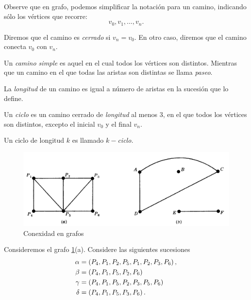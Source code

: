 	\begin{rem}
		Observe que en grafo, podemos simplificar la notación para un camino, indicando sólo los v\'ertices que recorre:
		$$v_{0}, v_{1},..., v_{n}.$$ 
	\end{rem}



	Diremos que el camino es \emph{cerrado} si $v_{n}=v_{0}.$ En otro caso, diremos que el camino conecta $v_{0}$ con $v_{n}.$
	 
	
	Un \emph{camino simple} es aquel en el cual todos los v\'ertices son distintos. Mientras que un camino en el que todas las aristas son distintas se llama \emph{paseo}.
	



	La \emph{longitud} de un camino es igual a número de aristas en la sucesión que lo define.
	 



	Un \emph{ciclo} es un camino cerrado de \emph{longitud} al menos 3, en el que todos los v\'ertices son distintos, excepto el inicial $v_{0}$ y el final $v_{n}.$
	
	
	Un ciclo de longitud $k$ es llamado \emph{$k-$ciclo.}



	\begin{figure}[h!]
		\centering
		\includegraphics[width=10 cm,keepaspectratio=true]{./md/grafo_8_8.png}
		\caption{Conexidad en grafos}
		\label{fig:md0504}
	\end{figure}



	\begin{problema}
		\label{lip:exmp:8.1}
		Consideremos el grafo \ref{fig:md0504}(a). Considere las siguientes sucesiones
		\begin{align*}
			\alpha&=\left( P_{4}, P_{1}, P_{2}, P_{5}, P_{1},P_{2}, P_{3}, P_{6}  \right), \\
			\beta&=\left( P_{4}, P_{1}, P_{5}, P_{2}, P_{6} \right) \\
			\gamma&= \left( P_{4}, P_{1}, P_{5}, P_{2}, P_{3}, P_{5}, P_{6} \right)\\
			\delta&=\left( P_{4}, P_{1}, P_{5}, P_{3}, P_{6} \right).
		\end{align*}
		
	\end{problema}
	



